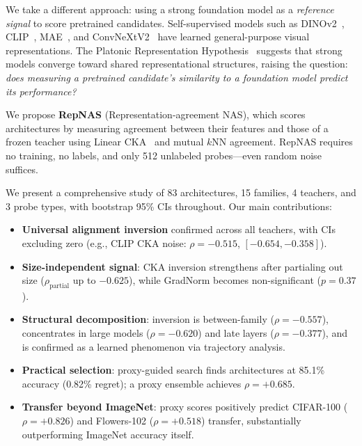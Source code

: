 \documentclass[10pt,twocolumn,letterpaper]{article}
\begin{document}
We take a different approach: using a strong foundation model as a \emph{reference signal} to score pretrained candidates.
Self-supervised models such as DINOv2~\cite{oquab2024dinov2}, CLIP~\cite{radford2021clip}, MAE~\cite{he2022mae}, and ConvNeXtV2~\cite{woo2023convnextv2} have learned general-purpose visual representations.
The Platonic Representation Hypothesis~\cite{huh2024platonic} suggests that strong models converge toward shared representational structures, raising the question: \emph{does measuring a pretrained candidate's similarity to a foundation model predict its performance?}

We propose \textbf{RepNAS} (Representation-agreement NAS), which scores architectures by measuring agreement between their features and those of a frozen teacher using Linear CKA~\cite{kornblith2019cka} and mutual $k$NN agreement.
RepNAS requires no training, no labels, and only 512 unlabeled probes---even random noise suffices.

We present a comprehensive study of 83 architectures, 15 families, 4 teachers, and 3 probe types, with bootstrap 95\% CIs throughout.
Our main contributions:
\begin{itemize}
  \item \textbf{Universal alignment inversion} confirmed across all teachers, with CIs excluding zero (e.g., CLIP CKA noise: $\rho = -0.515$, $[-0.654, -0.358]$).
  \item \textbf{Size-independent signal}: CKA inversion strengthens after partialing out size ($\rho_{\text{partial}}$ up to $-0.625$), while GradNorm becomes non-significant ($p = 0.37$).
  \item \textbf{Structural decomposition}: inversion is between-family ($\rho = -0.557$), concentrates in large models ($\rho = -0.620$) and late layers ($\rho = -0.377$), and is confirmed as a learned phenomenon via trajectory analysis.
  \item \textbf{Practical selection}: proxy-guided search finds architectures at 85.1\% accuracy (0.82\% regret); a proxy ensemble achieves $\rho = +0.685$.
  \item \textbf{Transfer beyond ImageNet}: proxy scores positively predict CIFAR-100 ($\rho = +0.826$) and Flowers-102 ($\rho = +0.518$) transfer, substantially outperforming ImageNet accuracy itself.
\end{itemize}


\end{document}
